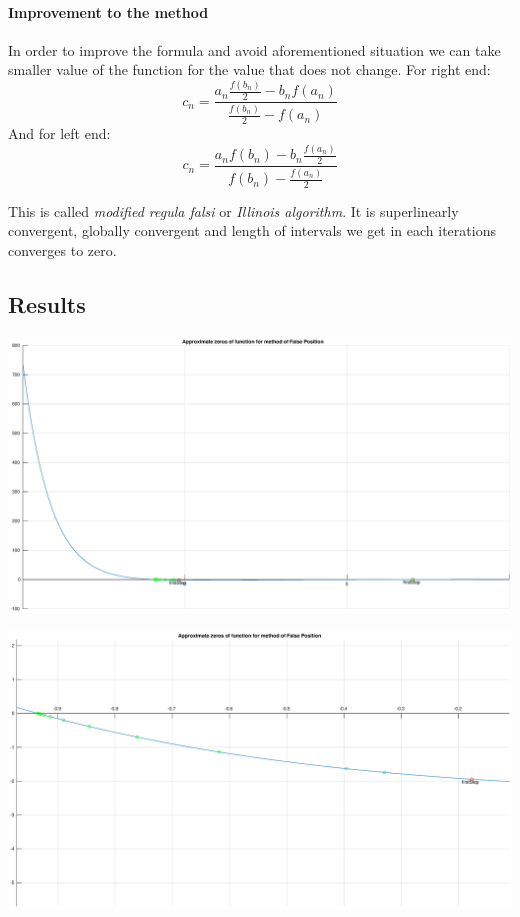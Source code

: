 \documentclass[12pt]{report}
\begin{document}
\paragraph{Improvement to the method}
In order to improve the formula and avoid aforementioned situation we can take smaller value of the function for the value that does not change.
For right end:
\[ c_n = \frac{a_n\frac{f(b_n)}{2} - b_nf(a_n)}{\frac{f(b_n)}{2} - f(a_n)} \]
And for left end:
\[ c_n = \frac{a_nf(b_n) - b_n\frac{f(a_n)}{2}}{f(b_n)- \frac{f(a_n)}{2}} \]

This is called \emph{modified regula falsi} or \emph{Illinois algorithm}.
It is superlinearly convergent, globally convergent and length of intervals we get in each iterations converges to zero.
\subsection{Results}

\begin{center}
   \includegraphics[scale=0.25]{task1falsepositionoverall.eps}
\end{center}

\begin{center}
   \includegraphics[scale=0.25]{task1falsepositionzommedleft.eps}
\end{center}
\end{document}
